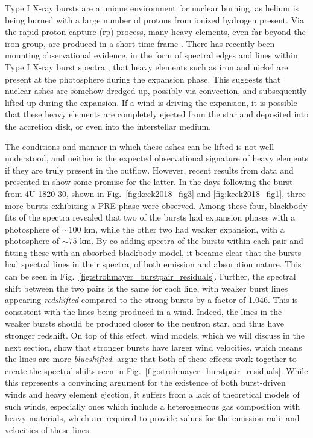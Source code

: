 \documentclass[../main.tex]{subfiles}
\begin{document}
Type I X-ray bursts are a unique environment for nuclear burning, as helium is being burned with a large number of protons from ionized hydrogen present. Via the rapid proton capture (rp) process, many heavy elements, even  far beyond the iron group, are produced in a short time frame \citep{Schatz1999}. There has recently been mounting observational evidence, in the form of spectral edges and lines within Type I X-ray burst spectra \citep{IntZand2010,Kajava2017,Strohmayer2019}, that heavy elements such as iron and nickel are present at the photosphere during the expansion phase. This suggests that nuclear ashes are somehow dredged up, possibly via convection, and subsequently lifted up during the expansion. If a wind is driving the expansion, it is possible that these heavy elements are completely ejected from the star and deposited into the accretion disk, or even into the interstellar medium.  

The conditions and manner in which these ashes can be lifted is not well understood, and neither is the expected observational signature of heavy elements if they are truly present in the outflow. However, recent results from \Nicer {} data and presented in \citet{Strohmayer2019} show some promise for the latter. In the days following the burst from 4U 1820-30, shown in Fig.~\ref{fig:keek2018_fig3} and \ref{fig:keek2018_fig1}, three more bursts exhibiting a PRE phase were observed. Among these four, blackbody fits of the spectra revealed that two of the bursts had expansion phases with a photosphere of ${\sim}100$ km, while the other two had weaker expansion, with a photosphere of ${\sim}75$ km. By co-adding spectra of the bursts within each pair and fitting these with an absorbed blackbody model, it became clear that the bursts had spectral lines in their spectra, of both emission and absorption nature. This can be seen in Fig.~\ref{fig:strohmayer_burstpair_residuals}. Further, the spectral shift between the two pairs is the same for each line, with weaker burst lines appearing \textit{redshifted} compared to the strong bursts by a factor of 1.046. This is consistent with the lines being produced in a wind. Indeed, the lines in the weaker bursts should be produced closer to the neutron star, and thus have stronger redshift. On top of this effect, wind models, which we will discuss in the next section, show that stronger bursts have larger wind velocities, which means the lines are more \textit{blueshifted}. \citet{Strohmayer2019} argue that both of these effects work together to create the spectral shifts seen in Fig.~\ref{fig:strohmayer_burstpair_residuals}. While this represents a convincing argument for the existence of both burst-driven winds and heavy element ejection, it suffers from a lack of theoretical models of such winds, especially ones which include a heterogeneous gas composition with heavy materials, which are required to provide values for the emission radii and velocities of these lines. \\
\end{document}

